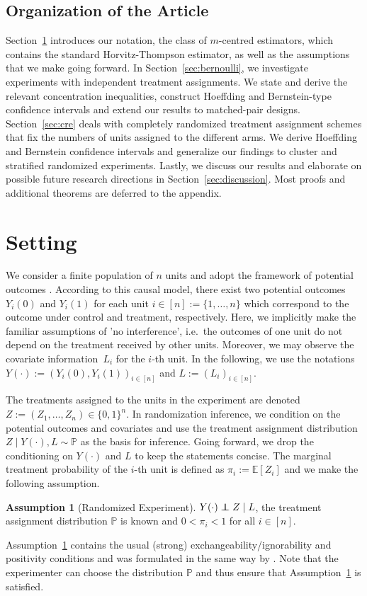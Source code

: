 \documentclass[aos]{imsart2}
\theoremstyle{plain}
\theoremstyle{definition}
\newtheorem{assumption}{Assumption}
\newcommand{\PR}{\mathbb{P}}
\newcommand{\E}{\mathbb{E}}
\newcommand\indep{\protect\mathpalette{\protect\independenT}{\perp}}
\def\independenT#1#2{\mathrel{\rlap{$#1#2$}\mkern2mu{#1#2}}}
\begin{document}
\subsection{Organization of the Article} Section~\ref{sec:setting} introduces our notation, the class of $m$-centred estimators, which contains the standard Horvitz-Thompson estimator, as well as the assumptions that we make going forward. In Section~\ref{sec:bernoulli}, we investigate experiments with independent treatment assignments. We state and derive the relevant concentration inequalities, construct Hoeffding and Bernstein-type confidence intervals and extend our results to matched-pair designs. Section~\ref{sec:cre} deals with completely randomized treatment assignment schemes that fix the numbers of units assigned to the different arms. We derive Hoeffding and Bernstein confidence intervals and generalize our findings to cluster and stratified randomized experiments. Lastly, we discuss our results and elaborate on possible future research directions in Section~\ref{sec:discussion}. Most proofs and additional theorems are deferred to the appendix.


\section{Setting}\label{sec:setting}
We consider a finite population of $n$ units and adopt the framework of potential outcomes \citep{splawa-neyman_application_1990,rubin_estimating_1974}. According to this causal model, there exist two potential outcomes $Y_i(0)$ and $Y_i(1)$ for each unit $i \in [n]:= \{1,\ldots,n\}$ which correspond to the outcome under control and treatment, respectively. Here, we implicitly make the familiar assumptions of 'no interference', i.e.\ the outcomes of one unit do not depend on the treatment received by other units. Moreover, we may observe the covariate information~$L_i$ for the $i$-th unit. In the following, we use the notations $Y(\cdot) := (Y_i(0),Y_i(1))_{i\in[n]}$ and $L:=(L_i)_{i\in[n]}$.

The treatments assigned to the units in the experiment are denoted $Z := (Z_1,\ldots,Z_n) \in \{0,1\}^n$. In randomization inference, we condition on the potential outcomes and covariates and use the treatment assignment distribution $Z \mid Y(\cdot),L \sim \PR$ as the basis for inference. Going forward, we drop the conditioning on $Y(\cdot)$ and $L$ to keep the statements concise. The marginal treatment probability of the $i$-th unit is defined as $\pi_i := \E[Z_i]$ and we make the following assumption.
\begin{assumption}[Randomized Experiment]\label{ass:rand-exp} $Y(\cdot) \indep Z \mid L$, the treatment assignment distribution $\PR$ is known and $0 < \pi_i < 1$ for all $i\in[n]$.
\end{assumption}
Assumption~\ref{ass:rand-exp} contains
the usual (strong) exchangeability/ignorability and positivity conditions \citep{hernan2020causal,ding_first_2024} and was formulated in the same way by \citet{zhang_2023_randomization_test}. Note that the experimenter can choose the distribution $\PR$ and thus ensure that Assumption~\ref{ass:rand-exp} is satisfied. 
\end{document}
